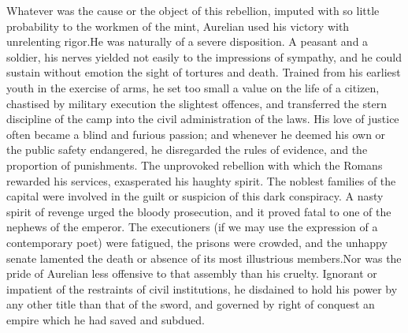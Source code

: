 

Whatever was the cause or the object of this rebellion, imputed
with so little probability to the workmen of the mint, Aurelian
used his victory with unrelenting rigor.\footnotemark[92] He was naturally of a
severe disposition. A peasant and a soldier, his nerves yielded
not easily to the impressions of sympathy, and he could sustain
without emotion the sight of tortures and death. Trained from his
earliest youth in the exercise of arms, he set too small a value
on the life of a citizen, chastised by military execution the
slightest offences, and transferred the stern discipline of the
camp into the civil administration of the laws. His love of
justice often became a blind and furious passion; and whenever he
deemed his own or the public safety endangered, he disregarded
the rules of evidence, and the proportion of punishments. The
unprovoked rebellion with which the Romans rewarded his services,
exasperated his haughty spirit. The noblest families of the
capital were involved in the guilt or suspicion of this dark
conspiracy. A nasty spirit of revenge urged the bloody
prosecution, and it proved fatal to one of the nephews of the
emperor. The executioners (if we may use the expression of a
contemporary poet) were fatigued, the prisons were crowded, and
the unhappy senate lamented the death or absence of its most
illustrious members.\footnotemark[93] Nor was the pride of Aurelian less
offensive to that assembly than his cruelty. Ignorant or
impatient of the restraints of civil institutions, he disdained
to hold his power by any other title than that of the sword, and
governed by right of conquest an empire which he had saved and
subdued.\footnotemark[94]




